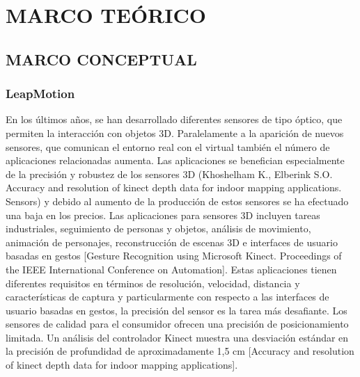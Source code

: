 \chapter{MARCO TEÓRICO}
\section{MARCO CONCEPTUAL}
\subsection{LeapMotion}

En los últimos años, se han desarrollado diferentes sensores de tipo óptico, que permiten la interacción con objetos 3D. Paralelamente a la aparición de nuevos sensores, que comunican el entorno real con el virtual también el número de aplicaciones relacionadas aumenta. Las aplicaciones se benefician especialmente de la precisión y robustez de los sensores 3D (Khoshelham K., Elberink S.O. Accuracy and resolution of kinect depth data for indoor mapping applications. Sensors) y debido al aumento de la producción de estos sensores se ha efectuado una baja en los precios. Las aplicaciones para sensores 3D incluyen tareas industriales, seguimiento de personas y objetos, análisis de movimiento, animación de personajes, reconstrucción de escenas 3D e interfaces de usuario basadas en gestos [Gesture Recognition using Microsoft Kinect. Proceedings of the IEEE International Conference on Automation]. Estas aplicaciones tienen diferentes requisitos en términos de resolución, velocidad, distancia y características de captura y particularmente con respecto a las interfaces de usuario basadas en gestos, la precisión del sensor es la tarea más desafiante. Los sensores de calidad para el consumidor ofrecen una precisión de posicionamiento limitada. Un análisis del controlador Kinect muestra una desviación estándar en la precisión de profundidad de aproximadamente 1,5 cm [Accuracy and resolution of kinect depth data for indoor mapping applications]. 







